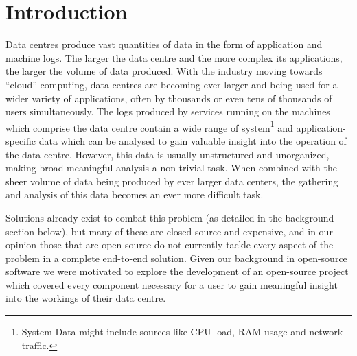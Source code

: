 \section{Introduction}

Data centres produce vast quantities of data in the form of application and
machine logs. The larger the data centre and the more complex its applications,
the larger the volume of data produced. With the industry moving towards “cloud”
computing, data centres are becoming ever larger and being used for a wider
variety of applications, often by thousands or even tens of thousands of users
simultaneously. The logs produced by services running on the machines which
comprise the data centre contain a wide range of system\footnote{System Data
might include sources like CPU load, RAM usage and network traffic.} and
application-specific data which can be analysed to gain valuable insight into
the operation of the
data centre. However, this data is usually unstructured and unorganized, making
broad meaningful analysis a non-trivial task. When combined with the sheer
volume of data being produced by ever larger data centers, the gathering and
analysis of this data becomes an ever more difficult task.

Solutions already exist to combat this problem (as detailed in the background
section below), but many of these are closed-source and expensive, and in our
opinion those that are open-source do not currently tackle every aspect of the
problem in a complete end-to-end solution. Given our background in open-source
software we were motivated to explore the development of an open-source project
which covered every component necessary for a user to gain meaningful insight
into the workings of their data centre.
